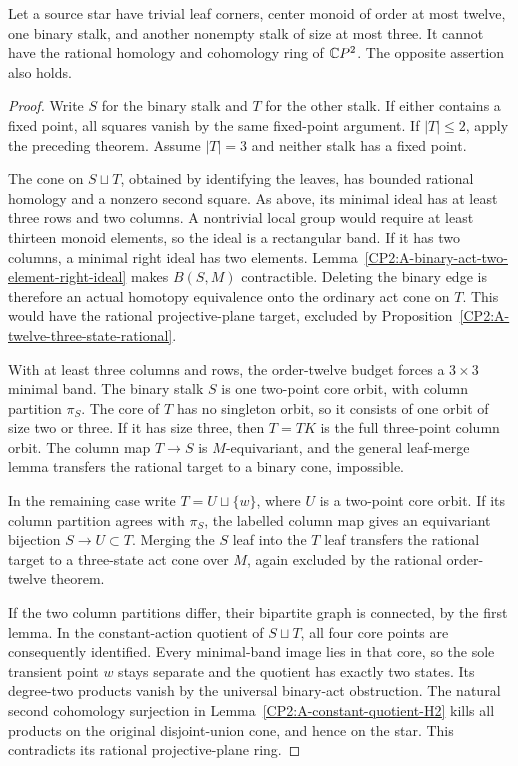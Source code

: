 \begin{theorem}
\label{CP2:A-star-twelve-binary-ternary-stalks}
Let a source star have trivial leaf corners, center monoid of
order at most twelve, one binary stalk, and another nonempty
stalk of size at most three. It cannot have the rational
homology and cohomology ring of $\mathbb{C}P^2$.
The opposite assertion also holds.
\end{theorem}
\begin{proof}
Write $S$ for the binary stalk and $T$ for the other stalk.
If either contains a fixed point, all squares vanish by the
same fixed-point argument. If $|T|\leq2$, apply the preceding
theorem. Assume $|T|=3$ and neither stalk has a fixed point.

The cone on $S\sqcup T$, obtained by identifying the leaves,
has bounded rational homology and a nonzero second square.
As above, its minimal ideal has at least three rows and two
columns. A nontrivial local group would require at least
thirteen monoid elements, so the ideal is a rectangular band.
If it has two columns, a minimal right ideal has two elements.
Lemma~\ref{CP2:A-binary-act-two-element-right-ideal} makes
$B(S,M)$ contractible. Deleting the binary edge is therefore
an actual homotopy equivalence onto the ordinary act cone on
$T$. This would have the rational projective-plane target,
excluded by Proposition~\ref{CP2:A-twelve-three-state-rational}.

With at least three columns and rows, the order-twelve budget
forces a $3\times3$ minimal band. The binary stalk $S$ is one
two-point core orbit, with column partition $\pi_S$.
The core of $T$ has no singleton orbit, so it consists of
one orbit of size two or three. If it has size three,
then $T=TK$ is the full three-point column orbit. The column
map $T\to S$ is $M$-equivariant, and the general leaf-merge
lemma transfers the rational target to a binary cone, impossible.

In the remaining case write $T=U\sqcup\{w\}$, where $U$
is a two-point core orbit. If its column partition agrees
with $\pi_S$, the labelled column map gives an equivariant
bijection $S\to U\subset T$. Merging the $S$ leaf into the
$T$ leaf transfers the rational target to a three-state act
cone over $M$, again excluded by the rational order-twelve
theorem.

If the two column partitions differ, their bipartite graph
is connected, by the first lemma. In the constant-action
quotient of $S\sqcup T$, all four core points are consequently
identified. Every minimal-band image lies in that core, so
the sole transient point $w$ stays separate and the quotient
has exactly two states. Its degree-two products vanish by
the universal binary-act obstruction. The natural second
cohomology surjection in
Lemma~\ref{CP2:A-constant-quotient-H2} kills all products on
the original disjoint-union cone, and hence on the star.
This contradicts its rational projective-plane ring.
\end{proof}

